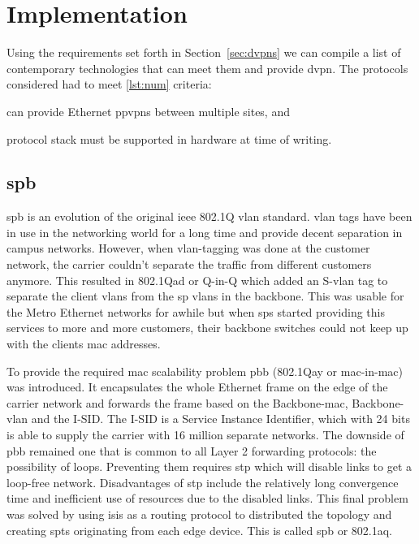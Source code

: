 \section{Implementation} %
\label{sec:implementation}

Using the requirements set forth in Section~\ref{sec:dvpns} we can compile a list of contemporary technologies that can meet them and provide \ac{dvpn}. The protocols considered had to meet \ref{lst:num} criteria:
\begin{inparaenum}[\itshape 1\upshape)]
	\item can provide Ethernet \acp{ppvpn} between multiple sites, and
	\item protocol stack must be supported in hardware at time of writing.
	\label{lst:num}
\end{inparaenum}

\subsection{\acs{spb}} %
\label{sub:spb}

\ac{spb} is an evolution of the original \acs{ieee} 802.1Q \ac{vlan} standard. \ac{vlan} tags have been in use in the networking world for a long time and provide decent separation in campus networks. However, when \ac{vlan}-tagging was done at the customer network, the carrier couldn't separate the traffic from different customers anymore. This resulted in 802.1Qad or Q-in-Q which added an S-\ac{vlan} tag to separate the client \acp{vlan} from the \ac{sp} \acp{vlan} in the backbone. This was usable for the Metro Ethernet networks for awhile but when \acp{sp} started providing this services to more and more customers, their backbone switches could not keep up with the clients \ac{mac} addresses.

To provide the required \acs{mac} scalability problem \ac{pbb} (802.1Qay or \ac{mac}-in-\ac{mac}) was introduced. It encapsulates the whole Ethernet frame on the edge of the carrier network and forwards the frame based on the Backbone-\ac{mac}, Backbone-\ac{vlan} and the I-SID. The I-SID is a Service Instance Identifier, which with 24 bits is able to supply the carrier with 16 million separate networks. The downside of \ac{pbb} remained one that is common to all Layer 2 forwarding protocols: the possibility of loops. Preventing them requires \ac{stp} which will disable links to get a loop-free network. Disadvantages of \ac{stp} include the relatively long convergence time and inefficient use of resources due to the disabled links. This final problem was solved by using \acs{isis} as a routing protocol to distributed the topology and creating \acp{spt} originating from each edge device. This is called \ac{spb} or 802.1aq.




